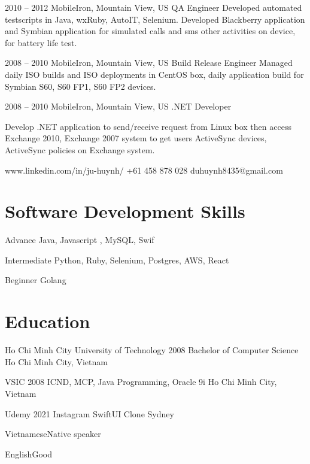\documentclass{tccv}
\begin{document}
\begin{eventlist}
\item{2010 -- 2012}
     {MobileIron, Mountain View, US}
     {QA Engineer}
\newline Developed automated testscripts in Java, wxRuby, AutoIT, Selenium.
\newline Developed Blackberry application and Symbian application for simulated
calls and sms other activities on device, for battery life test.

\item{2008 -- 2010}
     {MobileIron, Mountain View, US}
     {Build Release Engineer}
\newline Managed daily ISO builds and ISO deployments in CentOS box, daily application build for Symbian S60, S60 FP1, S60 FP2 devices.

\item{2008 -- 2010}
     {MobileIron, Mountain View, US}
     {.NET Developer}

Develop .NET application to send/receive request from Linux box then access Exchange 2010, Exchange 2007 system to get users ActiveSync devices,  ActiveSync policies on Exchange system.

\end{eventlist}

\personal
    {www.linkedin.com/in/ju-huynh/}
    {+61 458 878 028}
    {duhuynh8435@gmail.com}

\section{Software Development Skills}

\begin{factlist}

\item{Advance}
     {Java, Javascript , MySQL, Swif}

\item{Intermediate}
     {Python, Ruby, Selenium, Postgres, AWS, React}

\item{Beginner}
     {Golang}
\end{factlist}

\section{Education}

\begin{yearlist}

\item[Ho Chi Minh City University of Technology]{2008}
     {Bachelor of Computer Science}
     {Ho Chi Minh City, Vietnam}

\item[VSIC]{2008}
     {ICND, MCP, Java Programming, Oracle 9i}
     {Ho Chi Minh City, Vietnam}

\item[Udemy]{2021}
     {Instagram SwiftUI Clone}
     {Sydney}

\end{yearlist}

\begin{factlist}
\item{Vietnamese}{Native speaker}
\item{English}{Good}
\end{factlist}
\end{document}
